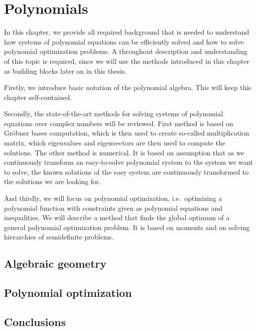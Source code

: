 \chapter{Polynomials}
In this chapter, we provide all required background that is needed to understand how systems of polynomial equations can be efficiently solved and how to solve polynomial optimization problems.
A throughout description and understanding of this topic is required, since we will use the methods introduced in this chapter as building blocks later on in this thesis.

Firstly, we introduce basic notation of the polynomial algebra.
This will keep this chapter self-contained.

Secondly, the state-of-the-art methods for solving systems of polynomial equations over complex numbers will be reviewed.
First method is based on Gr\"obner bases computation, which is then used to create so-called multiplication matrix, which eigenvalues and eigenvectors are then used to compute the solutions.
The other method is numerical.
It is based on assumption that as we continuously transform an easy-to-solve polynomial system to the system we want to solve, the known solutions of the easy system are continuously transformed to the solutions we are looking for.

And thirdly, we will focus on polynomial optimization, i.e.\ optimizing a polynomial function with constraints given as polynomial equations and inequalities.
We will describe a method that finds the global optimum of a general polynomial optimization problem.
It is based on moments and on solving hierarchies of semidefinite problems.



\section{Algebraic geometry}

\section{Polynomial optimization}

\section{Conclusions}
